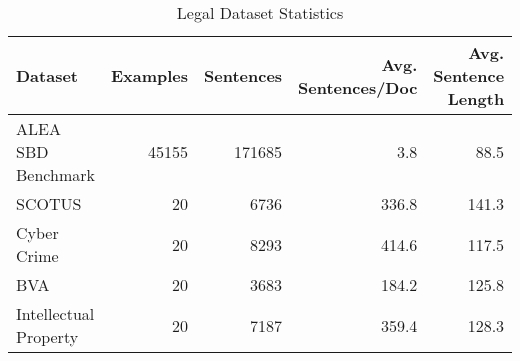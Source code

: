 \begin{table*}[htbp]
\centering
\caption{Legal Dataset Statistics}
\label{tab:dataset-stats}
\begin{tabular}{lrrrr}
\toprule
Dataset & Examples & Sentences & Avg. Sentences/Doc & Avg. Sentence Length \\
\midrule
ALEA SBD Benchmark & 45155 & 171685 & 3.8 & 88.5 \\
SCOTUS & 20 & 6736 & 336.8 & 141.3 \\
Cyber Crime & 20 & 8293 & 414.6 & 117.5 \\
BVA & 20 & 3683 & 184.2 & 125.8 \\
Intellectual Property & 20 & 7187 & 359.4 & 128.3 \\
\bottomrule
\end{tabular}
\end{table*}

